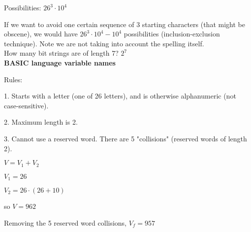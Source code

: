 \documentclass{exam}
\begin{document}
    Possibilities: $26^3 \cdot 10^4$
    
    If we want to avoid one certain sequence of 3 starting characters (that might be obscene), we would have $26^3 \cdot 10^4 - 10^4$ possibilities (inclusion-exclusion technique). Note we are not taking into account the spelling itself.\\
    
    How many bit strings are of length 7? $2^7$\\
    
    \textbf{BASIC language variable names}
    
    Rules: 
    
    1. Starts with a letter (one of 26 letters), and is otherwise alphanumeric (not case-sensitive).
    
    2. Maximum length is 2.
    
    3. Cannot use a reserved word. There are 5 "collisions" (reserved words of length 2).
    
    $V = V_1 + V_2$
    
    $V_1 = 26$
    
    $V_2 = 26 \cdot (26+10)$
    
    so $V = 962$
    
    Removing the 5 reserved word collisions, $V_f = 957$\\
    
    
\end{document}
